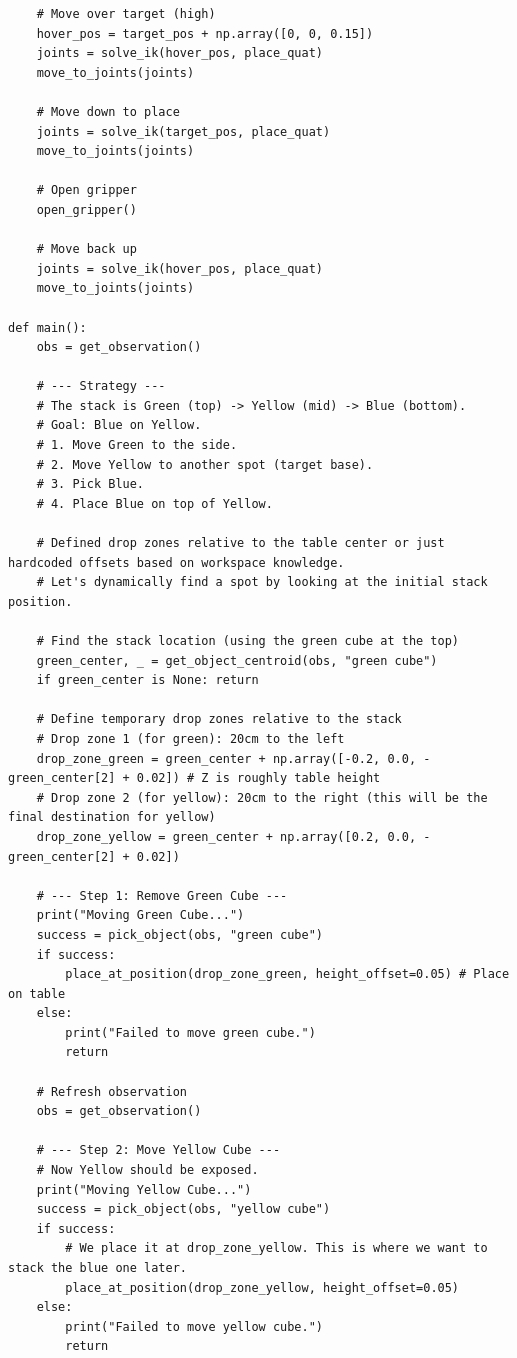 \begin{lstlisting}
    # Move over target (high)
    hover_pos = target_pos + np.array([0, 0, 0.15])
    joints = solve_ik(hover_pos, place_quat)
    move_to_joints(joints)
    
    # Move down to place
    joints = solve_ik(target_pos, place_quat)
    move_to_joints(joints)
    
    # Open gripper
    open_gripper()
    
    # Move back up
    joints = solve_ik(hover_pos, place_quat)
    move_to_joints(joints)

def main():
    obs = get_observation()
    
    # --- Strategy ---
    # The stack is Green (top) -> Yellow (mid) -> Blue (bottom).
    # Goal: Blue on Yellow.
    # 1. Move Green to the side.
    # 2. Move Yellow to another spot (target base).
    # 3. Pick Blue.
    # 4. Place Blue on top of Yellow.

    # Defined drop zones relative to the table center or just hardcoded offsets based on workspace knowledge.
    # Let's dynamically find a spot by looking at the initial stack position.
    
    # Find the stack location (using the green cube at the top)
    green_center, _ = get_object_centroid(obs, "green cube")
    if green_center is None: return

    # Define temporary drop zones relative to the stack
    # Drop zone 1 (for green): 20cm to the left
    drop_zone_green = green_center + np.array([-0.2, 0.0, -green_center[2] + 0.02]) # Z is roughly table height
    # Drop zone 2 (for yellow): 20cm to the right (this will be the final destination for yellow)
    drop_zone_yellow = green_center + np.array([0.2, 0.0, -green_center[2] + 0.02])
    
    # --- Step 1: Remove Green Cube ---
    print("Moving Green Cube...")
    success = pick_object(obs, "green cube")
    if success:
        place_at_position(drop_zone_green, height_offset=0.05) # Place on table
    else:
        print("Failed to move green cube.")
        return

    # Refresh observation
    obs = get_observation()

    # --- Step 2: Move Yellow Cube ---
    # Now Yellow should be exposed.
    print("Moving Yellow Cube...")
    success = pick_object(obs, "yellow cube")
    if success:
        # We place it at drop_zone_yellow. This is where we want to stack the blue one later.
        place_at_position(drop_zone_yellow, height_offset=0.05) 
    else:
        print("Failed to move yellow cube.")
        return


\end{lstlisting}
